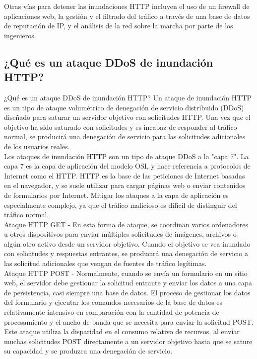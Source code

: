 \documentclass[14pt]{book}
\begin{document}
Otras vías para detener las inundaciones HTTP incluyen el uso de un firewall de aplicaciones web, la gestión y el filtrado del tráfico a través de una base de datos de reputación de IP, y el análisis de la red sobre la marcha por parte de los ingenieros.\\

\vspace{2em}

{\color{red} \subsection*{\textbf{¿Qué es un ataque DDoS de inundación HTTP?}}}
\vspace{1em}

¿Qué es un ataque DDoS de inundación HTTP?
Un ataque de inundación HTTP es un tipo de ataque volumétrico de denegación de servicio distribuido (DDoS) diseñado para saturar un servidor objetivo con solicitudes HTTP. Una vez que el objetivo ha sido saturado con solicitudes y es incapaz de responder al tráfico normal, se producirá una denegación de servicio para las solicitudes adicionales de los usuarios reales.\\


Los ataques de inundación HTTP son un tipo de ataque DDoS a la "capa 7". La capa 7 es la capa de aplicación del modelo OSI, y hace referencia a protocolos de Internet como el HTTP. HTTP es la base de las peticiones de Internet basadas en el navegador, y se suele utilizar para cargar páginas web o enviar contenidos de formularios por Internet. Mitigar los ataques a la capa de aplicación es especialmente complejo, ya que el tráfico malicioso es difícil de distinguir del tráfico normal.\\

Ataque HTTP GET - En esta forma de ataque, se coordinan varios ordenadores u otros dispositivos para enviar múltiples solicitudes de imágenes, archivos o algún otro activo desde un servidor objetivo. Cuando el objetivo se vea inundado con solicitudes y respuestas entrantes, se producirá una denegación de servicio a las solicitud adicionales que vengan de fuentes de tráfico legítimas.\\

Ataque HTTP POST - Normalmente, cuando se envía un formulario en un sitio web, el servidor debe gestionar la solicitud entrante y enviar los datos a una capa de persistencia, casi siempre una base de datos. El proceso de gestionar los datos del formulario y ejecutar los comandos necesarios de la base de datos es relativamente intensivo en comparación con la cantidad de potencia de procesamiento y el ancho de banda que se necesita para enviar la solicitud POST. Este ataque utiliza la disparidad en el consumo relativo de recursos, al enviar muchas solicitudes POST directamente a un servidor objetivo hasta que se sature su capacidad y se produzca una denegación de servicio.\\
\end{document}
